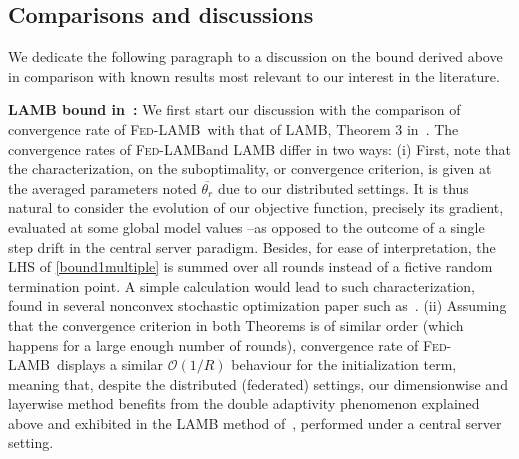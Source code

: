 \documentclass[11pt]{article}
\newcommand{\algo}{\textsc{Fed-LAMB}}
\begin{document}
\subsection{Comparisons and discussions}

We dedicate the following paragraph to a discussion on the bound derived above in comparison with known results most relevant to our interest in the literature.

\vspace{0.05in}
\textbf{LAMB bound in~\cite{you2019large}: }
We first start our discussion with the comparison of convergence rate of \algo\ with that of LAMB, Theorem 3 in~\cite{you2019large}. 
The convergence rates of \algo and LAMB differ in two ways: 
(i) First, note that the characterization, on the suboptimality, or convergence criterion, is given at the averaged parameters noted $\overline{\theta_r}$ due to our distributed settings. 
It is thus natural to consider the evolution of our objective function, precisely its gradient, evaluated at some global model values --as opposed to the outcome of a single step drift in the central server paradigm. 
Besides, for ease of interpretation, the LHS of \eqref{bound1multiple} is summed over all rounds instead of a fictive random termination point. A simple calculation would lead to such characterization, found in several nonconvex stochastic optimization paper such as~\cite{ghadimi2013stochastic}.
(ii)  Assuming that the convergence criterion in both Theorems is of similar order (which happens for a large enough number of rounds), convergence rate of \algo\ displays a similar $\mathcal{O}(1/R)$ behaviour for the initialization term, meaning that, despite the distributed (federated) settings, our dimensionwise and layerwise method benefits from the double adaptivity phenomenon explained above and exhibited in the LAMB method of~\cite{you2019large}, performed under a central server setting.
\end{document}
